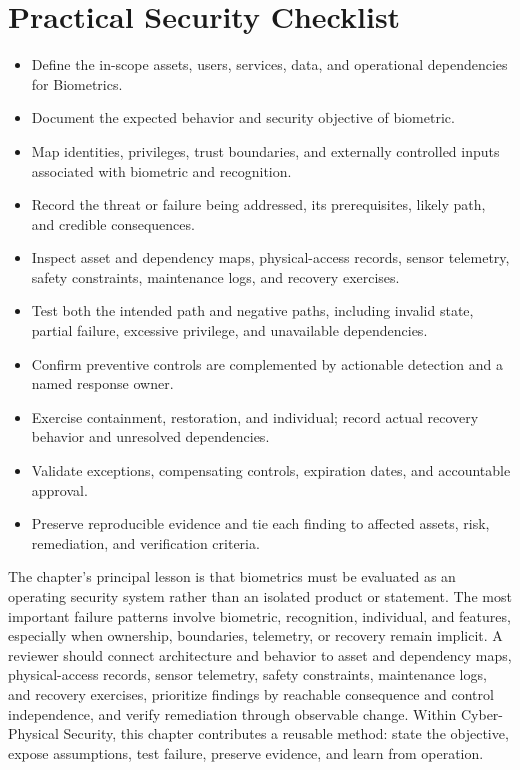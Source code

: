 \documentclass[11pt]{article}
\begin{document}
\section*{Practical Security Checklist}
\begin{itemize}[label=$\square$]
\item Define the in-scope assets, users, services, data, and operational dependencies for Biometrics.
\item Document the expected behavior and security objective of biometric.
\item Map identities, privileges, trust boundaries, and externally controlled inputs associated with biometric and recognition.
\item Record the threat or failure being addressed, its prerequisites, likely path, and credible consequences.
\item Inspect asset and dependency maps, physical-access records, sensor telemetry, safety constraints, maintenance logs, and recovery exercises.
\item Test both the intended path and negative paths, including invalid state, partial failure, excessive privilege, and unavailable dependencies.
\item Confirm preventive controls are complemented by actionable detection and a named response owner.
\item Exercise containment, restoration, and individual; record actual recovery behavior and unresolved dependencies.
\item Validate exceptions, compensating controls, expiration dates, and accountable approval.
\item Preserve reproducible evidence and tie each finding to affected assets, risk, remediation, and verification criteria.
\end{itemize}
\begin{synthesisbox}
The chapter's principal lesson is that biometrics must be evaluated as an operating security system rather than an isolated product or statement. The most important failure patterns involve biometric, recognition, individual, and features, especially when ownership, boundaries, telemetry, or recovery remain implicit. A reviewer should connect architecture and behavior to asset and dependency maps, physical-access records, sensor telemetry, safety constraints, maintenance logs, and recovery exercises, prioritize findings by reachable consequence and control independence, and verify remediation through observable change. Within Cyber-Physical Security, this chapter contributes a reusable method: state the objective, expose assumptions, test failure, preserve evidence, and learn from operation.
\end{synthesisbox}
\end{document}

